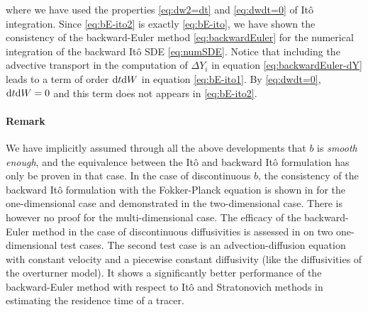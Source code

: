 where we have used the properties \eqref{eq:dw2=dt} and \eqref{eq:dwdt=0} of Itô integration. Since \eqref{eq:bE-ito2} is exactly \eqref{eq:bE-ito}, we have shown the consistency of the backward-Euler method \eqref{eq:backwardEuler} for the numerical integration of the backward Itô SDE \eqref{eq:numSDE}. Notice that including the advective transport in the computation of $\Delta Y_i$ in equation \eqref{eq:backwardEuler-dY} leads to a term of order $\rm dt \rm dW$ in equation \eqref{eq:bE-ito1}. By \eqref{eq:dwdt=0}, $\rm dt \rm dW = 0$ and this term does not appears in \eqref{eq:bE-ito2}. 

\paragraph{Remark} We have implicitly assumed through all the above developments that $b$ is \textit{smooth enough}, and the equivalence between the Itô and backward Itô formulation has only be proven in that case. In the case of discontinuous $b$, the consistency of the backward Itô formulation with the Fokker-Planck equation is shown in \cite{labolle2000diffusion} for the one-dimensional case and demonstrated in the two-dimensional case. There is however no proof for the multi-dimensional case. The efficacy of the backward-Euler method in the case of discontinuous diffusivities is assessed in \cite{spivakovskaya2007backward} on two one-dimensional test cases. The second test case is an advection-diffusion equation with constant velocity and a piecewise constant diffusivity (like the diffusivities of the overturner model). It shows a significantly better performance of the backward-Euler method with respect to Itô and Stratonovich methods in estimating the residence time of a tracer. %